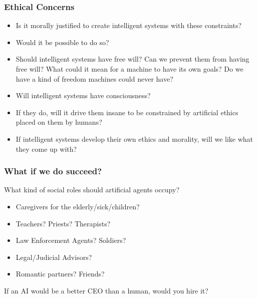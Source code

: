 \documentclass[UTF8,11pt,colorlinks,compress,openany]{beamer}%
\begin{document}
\begin{frame}\frametitle{Ethical Concerns}
\begin{itemize}
	\item Is it morally justified to create intelligent systems with these constraints?
	\item Would it be possible to do so?
	\item Should intelligent systems have free will? Can we prevent them from having free will? What could it mean for a machine to have its own goals? Do we have a kind of freedom machines could never have?
	\item Will intelligent systems have consciousness?
	\item If they do, will it drive them insane to be constrained by artificial ethics placed on them by humans?
	\item If intelligent systems develop their own ethics and morality, will we like what they come up with?
\end{itemize}
\end{frame}

\begin{frame}\frametitle{What if we do succeed?}
What kind of social roles should artificial agents occupy?
\begin{itemize}
	\item Caregivers for the elderly/sick/children?
	\item Teachers? Priests? Therapists?
	\item Law Enforcement Agents? Soldiers?
	\item Legal/Judicial Advisors?
	\item Romantic partners? Friends?
\end{itemize}
If an AI would be a better CEO than a human, would you hire it?
\end{frame}
\end{document}
